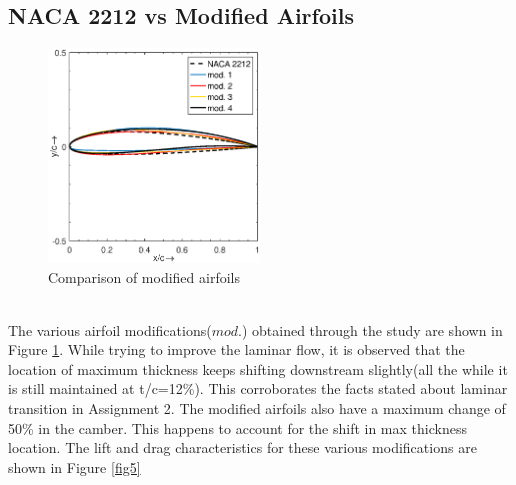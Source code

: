 \documentclass[main.tex]{subfiles}
\begin{document}
\subsection{NACA 2212 vs Modified Airfoils}
\begin{figure}[h]
\vspace*{-1em}
\centering
\includegraphics[width=0.5\textwidth]{./Images/Ass3/Airfoil_Comp}
\caption{Comparison of modified airfoils}
\label{fig4}
\vspace*{-1em}
\end{figure}
\\ The various airfoil modifications($mod.$) obtained through the study are shown in Figure \ref{fig4}. While trying to improve the laminar flow, it is observed that the location of maximum thickness keeps shifting downstream slightly(all the while it is still maintained at t/c=12\%). This corroborates the facts stated about laminar transition in Assignment 2. The modified airfoils also have a maximum change of 50\% in the camber. This happens to account for the shift in max thickness location. The lift and drag characteristics for these various modifications are shown in Figure \ref{fig5}
\end{document}
